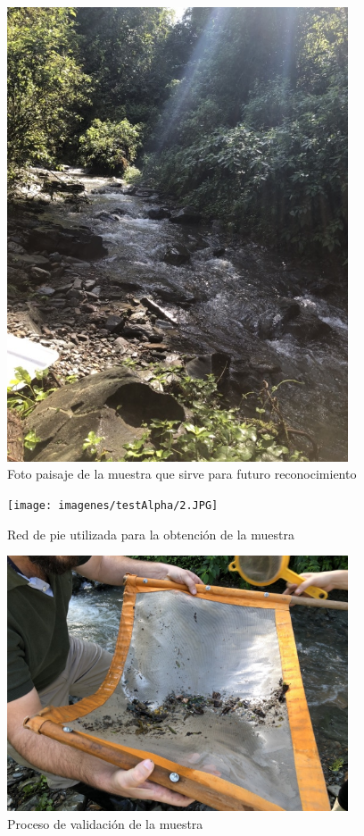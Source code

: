 		\begin{figure}[H]
			\centering
				\includegraphics[width=0.9\textwidth]{imagenes/testAlpha/1.JPG}
					\caption{Foto paisaje de la muestra que sirve para futuro reconocimiento}
		\end{figure}
		\begin{figure}[H]
			\centering
				\texttt{[image: imagenes/testAlpha/2.JPG]}
					\caption{Red de pie utilizada para la obtención de la muestra}
		\end{figure}
		\begin{figure}[H]
			\centering
				\includegraphics[width=0.9\textwidth]{imagenes/testAlpha/3.JPG}
					\caption{Proceso de validación de la muestra}
		\end{figure}
